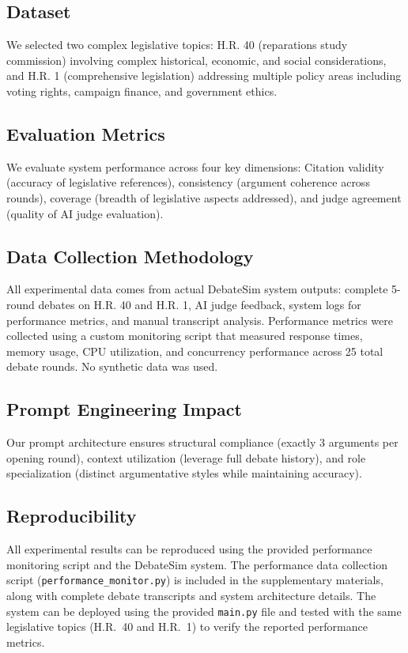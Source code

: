 \documentclass{article}
\begin{document}
\subsection{Dataset}

We selected two complex legislative topics: H.R. 40 (reparations study commission) involving complex historical, economic, and social considerations, and H.R. 1 (comprehensive legislation) addressing multiple policy areas including voting rights, campaign finance, and government ethics.

\subsection{Evaluation Metrics}

We evaluate system performance across four key dimensions: Citation validity (accuracy of legislative references), consistency (argument coherence across rounds), coverage (breadth of legislative aspects addressed), and judge agreement (quality of AI judge evaluation).

\subsection{Data Collection Methodology}

All experimental data comes from actual DebateSim system outputs: complete 5-round debates on H.R. 40 and H.R. 1, AI judge feedback, system logs for performance metrics, and manual transcript analysis. Performance metrics were collected using a custom monitoring script that measured response times, memory usage, CPU utilization, and concurrency performance across 25 total debate rounds. No synthetic data was used.

\subsection{Prompt Engineering Impact}

Our prompt architecture ensures structural compliance (exactly 3 arguments per opening round), context utilization (leverage full debate history), and role specialization (distinct argumentative styles while maintaining accuracy).

\subsection{Reproducibility}

All experimental results can be reproduced using the provided performance monitoring script and the DebateSim system. The performance data collection script (\texttt{performance\_monitor.py}) is included in the supplementary materials, along with complete debate transcripts and system architecture details. The system can be deployed using the provided \texttt{main.py} file and tested with the same legislative topics (H.R.~40 and H.R.~1) to verify the reported performance metrics.
\end{document}
